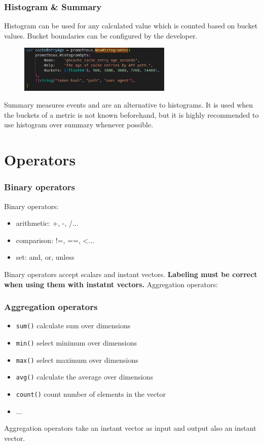\documentclass[xcolor=dvipsnames]{beamer}
\begin{document}
\begin{frame}
 \frametitle{Histogram \& Summary}
Histogram can be used for any calculated value which is counted based on bucket values. Bucket boundaries can be configured by the developer.
\begin{figure}
\centering
\includegraphics[width=0.65\textwidth]{code.png}

\end{figure}


Summary measures events and are an alternative to histograms.  It is used when the buckets of a metric is not known beforehand, but it is highly recommended to use histogram over summary whenever possible.

\end{frame}


\section{Operators}
\begin{frame}
 \frametitle{Binary operators}
Binary operators:
\begin{itemize}
\item arithmetic: +, -, /...
\item comparison: !=, ==, <...
\item set: and, or, unless
\end{itemize}
Binary operators accept scalars and instant vectors. \textbf{Labeling must be correct when using them with instatnt vectors.}
Aggregation operators:
\end{frame}

\begin{frame}
\frametitle{Aggregation operators}
\begin{itemize}
\item \texttt{sum()} calculate sum over dimensions
\item \texttt{min()} select minimum over dimensions
\item \texttt{max()} select maximum over dimensions
\item \texttt{avg()} calculate the average over dimensions
\item \texttt{count()} count number of elements in the vector
\item ...
\end{itemize}
Aggregation operators take an instant vector as input and output also an instant vector.
\end{frame}
\end{document}
